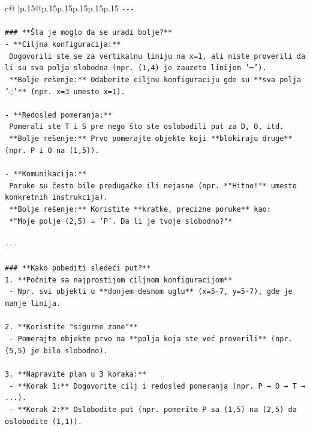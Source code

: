 \documentclass{article}
\begin{document}
{\begin{supertabular}{c@{$\;$}|p{.15\linewidth}@{}p{.15\linewidth}p{.15\linewidth}p{.15\linewidth}p{.15\linewidth}p{.15\linewidth}}
{{{\texttt{{-}{-}{-}} \\
\\ 
\texttt{\#\#\# **Šta je moglo da se uradi bolje?**} \\
\texttt{{-} **Ciljna konfiguracija:**} \\
\texttt{  Dogovorili ste se za vertikalnu liniju na x=1, ali niste proverili da li su sva polja slobodna (npr. (1,4) je zauzeto linijom '─').} \\
\texttt{  **Bolje rešenje:** Odaberite ciljnu konfiguraciju gde su **sva polja '◌'** (npr. x=3 umesto x=1).} \\
\\ 
\texttt{{-} **Redosled pomeranja:**} \\
\texttt{  Pomerali ste T i S pre nego što ste oslobodili put za D, O, itd.} \\
\texttt{  **Bolje rešenje:** Prvo pomerajte objekte koji **blokiraju druge** (npr. P i O na (1,5)).} \\
\\ 
\texttt{{-} **Komunikacija:**} \\
\texttt{  Poruke su često bile predugačke ili nejasne (npr. *"Hitno!"* umesto konkretnih instrukcija).} \\
\texttt{  **Bolje rešenje:** Koristite **kratke, precizne poruke** kao:} \\
\texttt{  *"Moje polje (2,5) = 'P'. Da li je tvoje slobodno?"*} \\
\\ 
\texttt{{-}{-}{-}} \\
\\ 
\texttt{\#\#\# **Kako pobediti sledeći put?**} \\
\texttt{1. **Počnite sa najprostijom ciljnom konfiguracijom**} \\
\texttt{   {-} Npr. svi objekti u **donjem desnom uglu** (x=5{-}7, y=5{-}7), gde je manje linija.} \\
\\ 
\texttt{2. **Koristite "sigurne zone"**} \\
\texttt{   {-} Pomerajte objekte prvo na **polja koja ste već proverili** (npr. (5,5) je bilo slobodno).} \\
\\ 
\texttt{3. **Napravite plan u 3 koraka:**} \\
\texttt{   {-} **Korak 1:** Dogovorite cilj i redosled pomeranja (npr. P → O → T → ...).} \\
\texttt{   {-} **Korak 2:** Oslobodite put (npr. pomerite P sa (1,5) na (2,5) da oslobodite (1,1)).} \\
}}}
\end{supertabular}}
\end{document}
